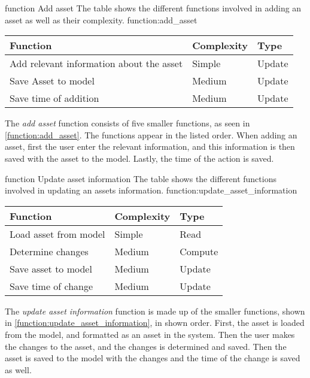 \fancyLayout
    {function}
    {Add asset}
    {The table shows the different functions involved in adding an asset as well as their complexity.}
    {function:add_asset}
    {
        \centering
        \begin{tabular}{|l|l|l|}
            \hline
            \textbf{Function} & \textbf{Complexity} & \textbf{Type}\\
            \hline
            \hline
            Add relevant information about the asset & Simple & Update \\
            \hline
            Save Asset to model & Medium & Update \\
            \hline
            Save time of addition & Medium & Update \\
            \hline
        \end{tabular}
}

The \textit{add asset} function consists of five smaller functions, as seen in \autoref{function:add_asset}. The functions appear in the listed order. When adding an asset, first the user enter the relevant information, and this information is then saved with the asset to the model. Lastly, the time of the action is saved.

\fancyLayout
    {function}
    {Update asset information}
    {The table shows the different functions involved in updating an assets information.}
    {function:update_asset_information}
    {
        \centering
        \begin{tabular}{|l|l|l|}
            \hline
            \textbf{Function} & \textbf{Complexity} & \textbf{Type}\\
            \hline
            \hline
            Load asset from model & Simple & Read \\
            \hline
            Determine changes & Medium & Compute \\
            \hline
            Save asset to model & Medium & Update \\
            \hline
            Save time of change & Medium & Update \\
            \hline
        \end{tabular}
}

The \textit{update asset information} function is made up of the smaller functions, shown in \autoref{function:update_asset_information}, in shown order. First, the asset is loaded from the model, and formatted as an asset in the system. Then the user makes the changes to the asset, and the changes is determined and saved. Then the asset is saved to the model with the changes and the time of the change is saved as well.


